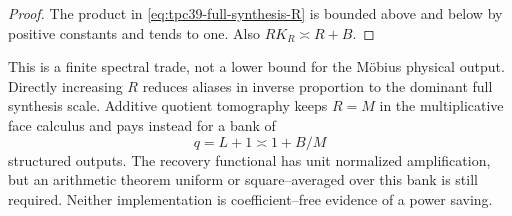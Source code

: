 \begin{proof}
The product in \eqref{eq:tpc39-full-synthesis-R} is bounded above and
below by positive constants and tends to one.  Also
\(RK_R\asymp R+B\).
\end{proof}

This is a finite spectral trade, not a lower bound for the M\"obius
physical output.  Directly increasing \(R\) reduces aliases in inverse
proportion to the dominant full synthesis scale.  Additive quotient
tomography keeps \(R=M\) in the multiplicative face calculus and pays
instead for a bank of
\begin{equation}
 q=L+1\asymp1+B/M
 \label{eq:tpc39-phase-bank-size}
\end{equation}
structured outputs.  The recovery functional has unit normalized
amplification, but
an arithmetic theorem uniform or square--averaged over this bank is still
required.  Neither implementation is coefficient--free evidence of a
power saving.
